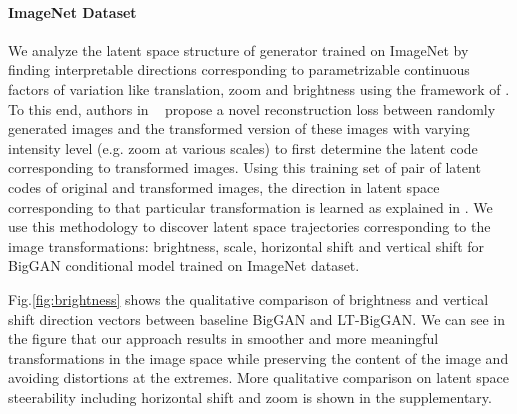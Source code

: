 \documentclass[10pt,twocolumn,letterpaper]{article}
\begin{document}
\paragraph{ImageNet Dataset}
We analyze the latent space structure of generator trained on ImageNet by finding interpretable directions corresponding to parametrizable continuous factors of variation like translation, zoom and brightness using the framework of \cite{controlling2020iclr}. To this end, authors in ~\cite{controlling2020iclr} propose a novel reconstruction loss between randomly generated images and the transformed version of these images with varying intensity level (e.g. zoom at various scales) to first determine the latent code corresponding to transformed images. Using this training set of pair of latent codes of original and transformed images, the direction in latent space corresponding to that particular transformation is learned as explained in \cite{controlling2020iclr}. We use this methodology to discover latent space trajectories corresponding to the image transformations: brightness, scale, horizontal shift and vertical shift for BigGAN \cite{biggan2018brock} conditional model trained on ImageNet dataset.





Fig.\ref{fig:brightness} shows the qualitative comparison of brightness and vertical shift direction vectors between baseline BigGAN and LT-BigGAN. We can see in the figure that our approach results in smoother and more meaningful transformations in the image space while preserving the content of the image and avoiding distortions at the extremes. More qualitative comparison on latent space steerability including horizontal shift and zoom is shown in the supplementary. 
\end{document}
